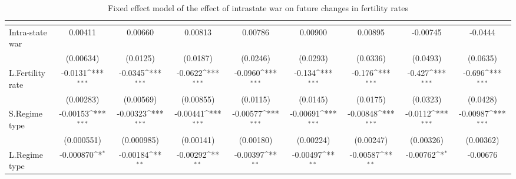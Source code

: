 \begin{table}[htbp]\centering
\def\sym#1{\ifmmode^{#1}\else\(^{#1}\)\fi}
\caption{Fixed effect model of the effect of intrastate war on future changes in fertility rates \label{intrawarfertility}}
\begin{tabular}{l*{8}{c}}
\hline\hline
                    &&&&&&&&\\
\hline
Intra-state war     &     0.00411         &     0.00660         &     0.00813         &     0.00786         &     0.00900         &     0.00895         &    -0.00745         &     -0.0444         \\
                    &   (0.00634)         &    (0.0125)         &    (0.0187)         &    (0.0246)         &    (0.0293)         &    (0.0336)         &    (0.0493)         &    (0.0635)         \\
[1em]
L.Fertility rate    &     -0.0131\sym{***}&     -0.0345\sym{***}&     -0.0622\sym{***}&     -0.0960\sym{***}&      -0.134\sym{***}&      -0.176\sym{***}&      -0.427\sym{***}&      -0.696\sym{***}\\
                    &   (0.00283)         &   (0.00569)         &   (0.00855)         &    (0.0115)         &    (0.0145)         &    (0.0175)         &    (0.0323)         &    (0.0428)         \\
[1em]
S.Regime type       &    -0.00153\sym{***}&    -0.00323\sym{***}&    -0.00441\sym{***}&    -0.00577\sym{***}&    -0.00691\sym{***}&    -0.00848\sym{***}&     -0.0112\sym{***}&    -0.00987\sym{***}\\
                    &  (0.000551)         &  (0.000985)         &   (0.00141)         &   (0.00180)         &   (0.00224)         &   (0.00247)         &   (0.00326)         &   (0.00362)         \\
[1em]
L.Regime type       &   -0.000870\sym{*}  &    -0.00184\sym{**} &    -0.00292\sym{**} &    -0.00397\sym{**} &    -0.00497\sym{**} &    -0.00587\sym{**} &    -0.00762\sym{*}  &    -0.00676         \\

\end{tabular}
\end{table}
